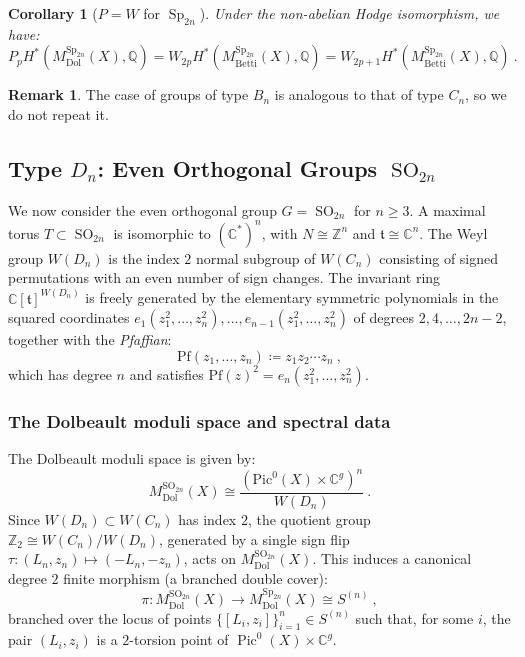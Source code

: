 \documentclass[11pt, a4paper]{amsart}
\newtheorem{corollary}[theorem]{Corollary}
\theoremstyle{definition}
\newtheorem{remark}[theorem]{Remark}
\theoremstyle{myitemstyle}
\newcommand{\C}{\mathbb{C}}
\DeclareMathOperator{\Pic}{Pic}
\DeclareMathOperator{\Sp}{Sp}
\DeclareMathOperator{\SO}{SO}
\newcommand{\Dol}{{\mathrm{Dol}}}
\newcommand{\Betti}{{\mathrm{Betti}}}
\begin{document}
\begin{corollary}[$P=W$ for $\Sp_{2n}$]\label{cor:PW-Cn}
Under the non-abelian Hodge isomorphism, we have:
\[
P_p H^*(M_{\Dol}^{\Sp_{2n}}(X), \mathbb{Q}) = W_{2p} H^*(M_{\Betti}^{\Sp_{2n}}(X), \mathbb{Q}) = W_{2p+1} H^*(M_{\Betti}^{\Sp_{2n}}(X), \mathbb{Q})\ .
\]
\end{corollary}

\begin{remark} The case of groups of type $B_n$ is analogous to that of type $C_n$, so we do not repeat it. 
\end{remark}

\subsection{Type $D_n$: Even Orthogonal Groups $\SO_{2n}$}
\label{subsec:type-Dn}

We now consider the even orthogonal group $G = \SO_{2n}$ for $n \ge 3$.
A maximal torus $T \subset \SO_{2n}$ is isomorphic to $(\mathbb{C}^*)^n$, with $N \cong \mathbb{Z}^n$ and $\mathfrak{t} \cong \mathbb{C}^n$. The Weyl group $W(D_n)$ is the index $2$ normal subgroup of $W(C_n)$ consisting of signed permutations with an even number of sign changes.
The invariant ring $\mathbb{C}[\mathfrak{t}]^{W(D_n)}$ is freely generated by the elementary symmetric polynomials in the squared coordinates $e_1(z_1^2,\ldots,z_n^2), \dots, e_{n-1}(z_1^2,\ldots, z_n^2)$ of degrees $2, 4, \dots, 2n-2$, together with the \emph{Pfaffian}:
\[
\mathrm{Pf}(z_1, \dots, z_n) \coloneqq z_1 z_2 \cdots z_n\ ,
\]
which has degree $n$ and satisfies $\mathrm{Pf}(z)^2 = e_n(z_1^2, \dots, z_n^2)$.

\subsubsection{The Dolbeault moduli space and spectral data}
The Dolbeault moduli space is given by:
\[
M_{\Dol}^{\SO_{2n}}(X) \cong \frac{(\mathrm{Pic}^0(X) \times \mathbb{C}^g)^n}{W(D_n)}\ .
\]
Since $W(D_n) \subset W(C_n)$ has index $2$, the quotient group $\mathbb{Z}_2 \cong W(C_n)/W(D_n)$, generated by a single sign flip $\tau \colon (L_n, z_n) \mapsto (-L_n, -z_n)$, acts on $M_{\Dol}^{\SO_{2n}}(X)$. This induces a canonical degree $2$ finite morphism (a branched double cover):
\[
\pi \colon M_{\Dol}^{\SO_{2n}}(X) \longrightarrow M_{\Dol}^{\Sp_{2n}}(X) \cong S^{(n)}\ ,
\]
branched over the locus of points $\{[L_i,z_i]\}_{i=1}^n\in S^{(n)}$ such that, for some $i$, the pair $(L_i,z_i)$ is a $2$-torsion point of $\Pic^0(X)\times\C^g$.
\end{document}
